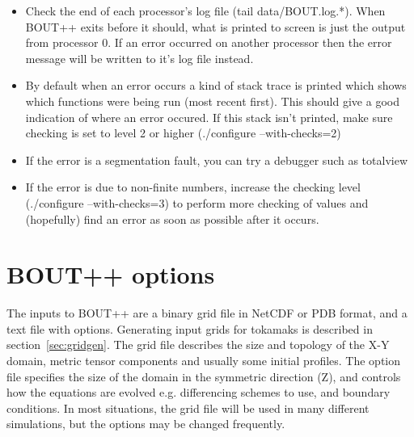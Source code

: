 \documentclass[12pt]{article}
\begin{document}
\begin{itemize}
\item Check the end of each processor's log file (tail data/BOUT.log.*). When BOUT++ exits before
it should, what is printed to screen is just the output from processor 0.
If an error occurred on another processor then the error message will be written to it's log file instead.
\item By default when an error occurs a kind of stack trace is printed which shows which functions
were being run (most recent first). This should give a good indication of where an error occured.
If this stack isn't printed, make sure checking is set to level 2 or higher (./configure --with-checks=2)
\item If the error is a segmentation fault, you can try a debugger such as totalview
\item If the error is due to non-finite numbers, increase the checking level
(./configure --with-checks=3) to perform more checking of values
and (hopefully) find an error as soon as possible after it occurs.
\end{itemize}

\section{BOUT++ options}
\label{sec:options}

The inputs to BOUT++ are a binary grid file in NetCDF or PDB format,
and a text file with options. Generating input grids for tokamaks is
described in section~\ref{sec:gridgen}. The grid file describes the size
and topology of the X-Y domain, metric tensor components and usually
some initial profiles. The option file specifies the size of the domain
in the symmetric direction (Z), and controls how the equations are evolved
e.g. differencing schemes to use, and boundary conditions.
In most situations, the grid file will be used in many different simulations,
but the options may be changed frequently. 
\end{document}

